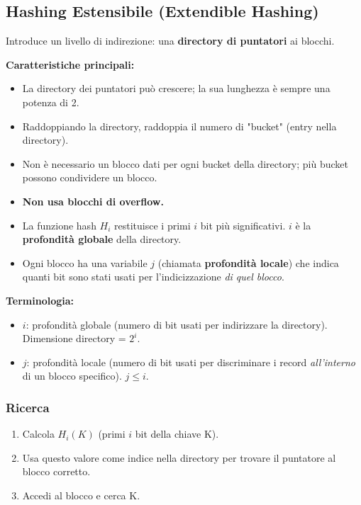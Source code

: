 \subsection{Hashing Estensibile (Extendible Hashing)}
Introduce un livello di indirezione: una \textbf{directory di puntatori} ai blocchi.

\textbf{Caratteristiche principali:}
\begin{itemize}
    \item La directory dei puntatori può crescere; la sua lunghezza è sempre una potenza di 2.
    \item Raddoppiando la directory, raddoppia il numero di "bucket" (entry nella directory).
    \item Non è necessario un blocco dati per ogni bucket della directory; più bucket possono condividere un blocco.
    \item \textbf{Non usa blocchi di overflow.}
    \item La funzione hash $H_i$ restituisce i primi $i$ bit più significativi. $i$ è la \textbf{profondità globale} della directory.
    \item Ogni blocco ha una variabile $j$ (chiamata \textbf{profondità locale}) che indica quanti bit sono stati usati per l'indicizzazione \textit{di quel blocco}.
\end{itemize}

\textbf{Terminologia:}
\begin{itemize}
    \item $i$: profondità globale (numero di bit usati per indirizzare la directory). Dimensione directory = $2^i$.
    \item $j$: profondità locale (numero di bit usati per discriminare i record \textit{all'interno} di un blocco specifico). $j \le i$.
\end{itemize}

\subsubsection{Ricerca}
\begin{enumerate}
    \item Calcola $H_i(K)$ (primi $i$ bit della chiave K).
    \item Usa questo valore come indice nella directory per trovare il puntatore al blocco corretto.
    \item Accedi al blocco e cerca K.
\end{enumerate}

